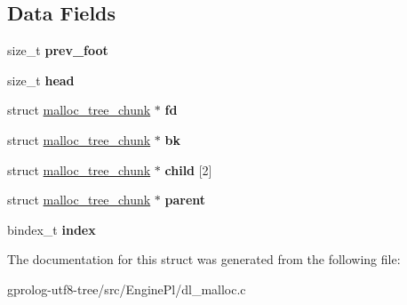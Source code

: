 \subsection*{Data Fields}
\begin{DoxyCompactItemize}
\item 
size\+\_\+t {\bfseries prev\+\_\+foot}\hypertarget{structmalloc__tree__chunk_a0b7e321702857b18f5013a3182b99262}{}\label{structmalloc__tree__chunk_a0b7e321702857b18f5013a3182b99262}

\item 
size\+\_\+t {\bfseries head}\hypertarget{structmalloc__tree__chunk_a1737b1a78f4bfbf0047210e3f3fd014d}{}\label{structmalloc__tree__chunk_a1737b1a78f4bfbf0047210e3f3fd014d}

\item 
struct \hyperlink{structmalloc__tree__chunk}{malloc\+\_\+tree\+\_\+chunk} $\ast$ {\bfseries fd}\hypertarget{structmalloc__tree__chunk_a5584ad2f70ef7ad1a5eb5f55820e3fe9}{}\label{structmalloc__tree__chunk_a5584ad2f70ef7ad1a5eb5f55820e3fe9}

\item 
struct \hyperlink{structmalloc__tree__chunk}{malloc\+\_\+tree\+\_\+chunk} $\ast$ {\bfseries bk}\hypertarget{structmalloc__tree__chunk_a862e6cafa961c1f63d4b10d67480cba0}{}\label{structmalloc__tree__chunk_a862e6cafa961c1f63d4b10d67480cba0}

\item 
struct \hyperlink{structmalloc__tree__chunk}{malloc\+\_\+tree\+\_\+chunk} $\ast$ {\bfseries child} \mbox{[}2\mbox{]}\hypertarget{structmalloc__tree__chunk_a560fa0afc644c1e05f4fab62818ab6cd}{}\label{structmalloc__tree__chunk_a560fa0afc644c1e05f4fab62818ab6cd}

\item 
struct \hyperlink{structmalloc__tree__chunk}{malloc\+\_\+tree\+\_\+chunk} $\ast$ {\bfseries parent}\hypertarget{structmalloc__tree__chunk_ae15ae9af5d9c57488718f0649868b7fe}{}\label{structmalloc__tree__chunk_ae15ae9af5d9c57488718f0649868b7fe}

\item 
bindex\+\_\+t {\bfseries index}\hypertarget{structmalloc__tree__chunk_a3015f2a8d6cc5cdb7abaf34e902c46a4}{}\label{structmalloc__tree__chunk_a3015f2a8d6cc5cdb7abaf34e902c46a4}

\end{DoxyCompactItemize}


The documentation for this struct was generated from the following file\+:\begin{DoxyCompactItemize}
\item 
gprolog-\/utf8-\/tree/src/\+Engine\+Pl/dl\+\_\+malloc.\+c\end{DoxyCompactItemize}
